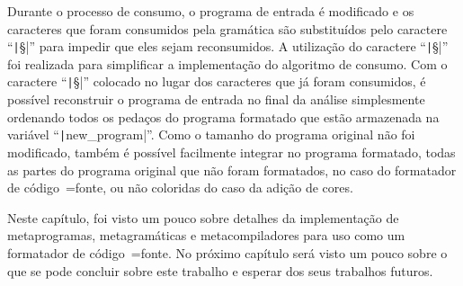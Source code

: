 Durante o processo de consumo,
o programa de entrada é modificado e
os caracteres que foram consumidos pela gramática são substituídos pelo caractere ``\texttt|§|'' para impedir que eles sejam reconsumidos.
A utilização do caractere ``\texttt|§|'' foi realizada para simplificar a implementação do algoritmo de consumo.
Com o caractere ``\texttt|§|'' colocado no lugar dos caracteres que já foram consumidos,
é possível reconstruir o programa de entrada no final da análise simplesmente ordenando todos os pedaços do programa formatado que estão armazenada na variável ``\texttt|new_program|''.
Como o tamanho do programa original não foi modificado,
também é possível facilmente integrar no programa formatado,
todas as partes do programa original que não foram formatados,
no caso do formatador de código~=fonte,
ou não coloridas do caso da adição de cores.

Neste capítulo,
foi visto um pouco sobre detalhes da implementação de metaprogramas,
metagramáticas e
metacompiladores para uso como um formatador de código~=fonte.
No próximo capítulo será visto um pouco sobre o que se pode concluir sobre este trabalho e
esperar dos seus trabalhos futuros.
